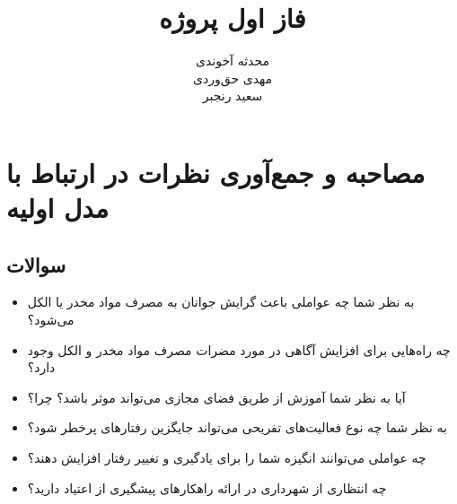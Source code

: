 \documentclass[dvipsnames, svgnames, x11names, 11pt]{article}
\title{فاز اول پروژه}
\author{
محدثه آخوندی \\
مهدی حق‌وردی \\
سعید رنجبر
}
\date{}
\begin{document}
\maketitle
\tableofcontents
\listoffigures

\section{مصاحبه و جمع‌آوری نظرات در ارتباط با مدل اولیه}

\subsection{سوالات}
\begin{itemize}
\item 
به نظر شما چه عواملی باعث گرایش جوانان به مصرف مواد مخدر یا الکل می‌شود؟
\item 
چه راه‌هایی برای افزایش آگاهی در مورد مضرات مصرف مواد مخدر و الکل وجود دارد؟
\item 
آیا به نظر شما آموزش از طریق فضای مجازی می‌تواند موثر باشد؟ چرا؟
\item 
به نظر شما چه نوع فعالیت‌های تفریحی می‌تواند جایگزین رفتارهای پرخطر شود؟
\item 
چه عواملی می‌توانند انگیزه شما را برای یادگیری و تغییر رفتار افزایش دهند؟
\item 
چه انتظاری از شهرداری در ارائه راهکارهای پیشگیری از اعتیاد دارید؟
\end{itemize}
\end{document}
